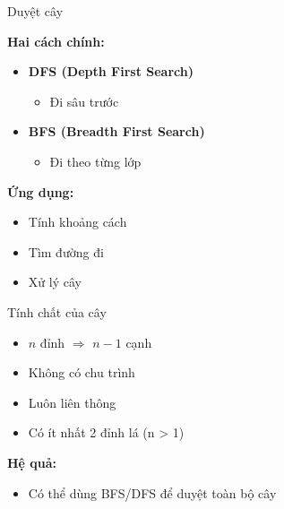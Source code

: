 \begin{frame}{Duyệt cây}

\textbf{Hai cách chính:}

\vspace{0.4cm}

\begin{itemize}
\item \textbf{DFS (Depth First Search)}
\begin{itemize}
\item Đi sâu trước
\end{itemize}

\vspace{0.3cm}

\item \textbf{BFS (Breadth First Search)}
\begin{itemize}
\item Đi theo từng lớp
\end{itemize}

\end{itemize}

\vspace{0.4cm}

\textbf{Ứng dụng:}
\begin{itemize}
\item Tính khoảng cách
\item Tìm đường đi
\item Xử lý cây
\end{itemize}

\end{frame}
\begin{frame}{Tính chất của cây}

\begin{itemize}
\item $n$ đỉnh $\Rightarrow$ $n-1$ cạnh
\item Không có chu trình
\item Luôn liên thông
\item Có ít nhất 2 đỉnh lá (n > 1)
\end{itemize}

\vspace{0.4cm}

\textbf{Hệ quả:}
\begin{itemize}
\item Có thể dùng BFS/DFS để duyệt toàn bộ cây
\end{itemize}

\end{frame}
